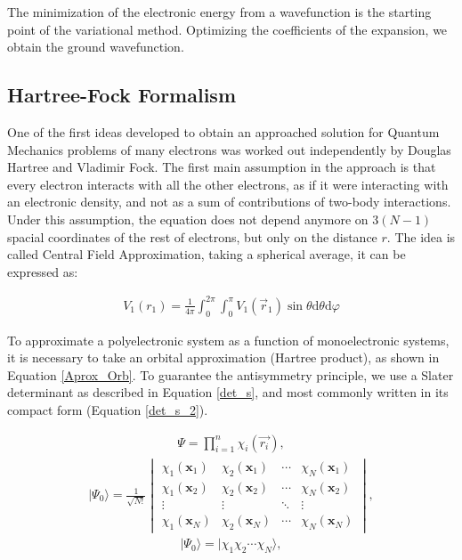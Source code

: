 The minimization of the electronic energy from a wavefunction is the starting
point of the variational method. Optimizing the
coefficients of the expansion,
we obtain the ground wavefunction. 

\subsection{Hartree-Fock Formalism}

One of the first ideas developed to obtain an approached solution for Quantum
Mechanics problems of many electrons was worked out independently by Douglas
Hartree and Vladimir Fock. The first main assumption in the approach is that
every electron interacts with all the other electrons, as if it were interacting with
an electronic density, and not as a sum of contributions of two-body
interactions. Under this assumption, the equation does not depend anymore on $3(N-1)$
spacial coordinates of the rest of electrons, but only on the distance $r$. The
idea is called Central Field Approximation, taking a spherical average, it can
be expressed as:

%
\begin{align}
V_{1}(r_{1})=\frac{1}{4\pi}\int_{0}^{2\pi}\int_{0}^{\pi} V_{1}(\vec{r}_1)\sin\theta
\mathrm{d}\theta \mathrm{d}\varphi
\end{align}

To approximate a polyelectronic system as a function of monoelectronic systems,
it is necessary to take an orbital approximation (Hartree product), as shown
in Equation \ref{Aprox_Orb}. To guarantee the antisymmetry principle, we
use a Slater determinant as described in Equation \ref{det_s}, and
most commonly written in its compact form (Equation \ref{det_s_2}).

%
\begin{align}
\Psi = \prod_{i=1}^{n} \chi_i (\vec{r_i}) ,
\label{Aprox_Orb}
\end{align}
\begin{align}
|\Psi_0\rangle = \frac{1}{\sqrt{N!}} \begin{vmatrix}
\chi_{1}(\mathbf{x}_1) & \chi_{2}(\mathbf{x}_1) & \cdots & \chi_{N}(\mathbf{x}_1) \\
\chi_{1}(\mathbf{x}_2) & \chi_{2}(\mathbf{x}_2) & \cdots & \chi_{N}(\mathbf{x}_2) \\
\vdots & \vdots & \ddots & \vdots \\
\chi_{1}(\mathbf{x}_N) & \chi_{2}(\mathbf{x}_N) & \cdots & \chi_{N}(\mathbf{x}_N)
\end{vmatrix} ,
\label{det_s}
\end{align}
%
\begin{align}
|\Psi_0\rangle = |\chi_{1}\chi_{2} \cdots \chi_{N} \rangle ,
\label{det_s_2}
\end{align}

